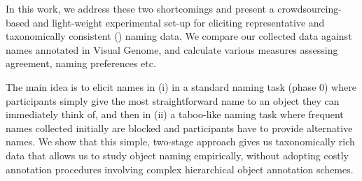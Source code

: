 In this work, we address these two shortcomings and present a crowdsourcing-based and light-weight experimental set-up for eliciting representative and taxonomically consistent () naming data. We compare our collected data against names annotated in Visual Genome, and calculate various measures assessing agreement, naming preferences etc.

The main idea is to elicit names in (i) in a standard naming task (phase 0) where participants simply give the most straightforward name to an object they can immediately think of, and then in (ii) a taboo-like naming task where frequent names collected initially are blocked and participants have to provide alternative names. We show that this simple, two-stage approach gives us taxonomically rich data that allows us to study object naming empirically, without adopting costly annotation procedures involving complex hierarchical object annotation schemes.

